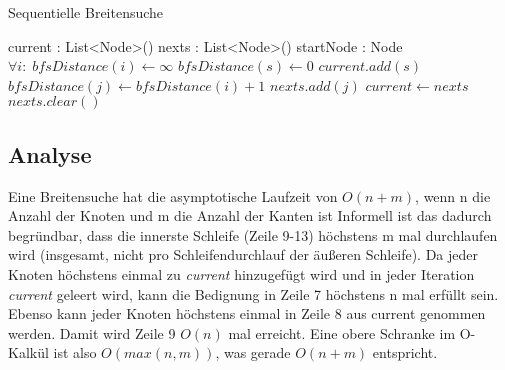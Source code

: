 \begin{algorithm}
	\caption{Sequentielle Breitensuche}
	\label{alg:sequential_bfs}
	\begin{algorithmic}[1]
		\State current : List<Node>()
		\State nexts : List<Node>()
		\State startNode : Node
		\State  $\forall i: \; bfsDistance(i) \gets \infty$
		\State $bfsDistance(s) \gets 0$
		\State $current.add(s)$
						\State $bfsDistance(j) \gets bfsDistance(i) + 1$
						\State $nexts.add(j)$
					\EndIf
				\EndFor
			\EndFor
			\State $current \gets nexts$
			\State $nexts.clear()$
		\EndWhile
	\end{algorithmic}
\end{algorithm}


\subsection{Analyse} %
\label{sub:analyse}
Eine Breitensuche hat die asymptotische Laufzeit von $O(n + m)$, wenn n die Anzahl der Knoten und m die Anzahl der Kanten ist Informell ist das dadurch begründbar, dass die innerste Schleife (Zeile 9-13) höchstens m mal durchlaufen wird (insgesamt, nicht pro Schleifendurchlauf der äußeren Schleife). Da jeder Knoten höchstens einmal zu \textit{current} hinzugefügt wird und in jeder Iteration \textit{current} geleert wird, kann die Bedignung in Zeile 7 höchstens n mal erfüllt sein. Ebenso kann jeder Knoten höchstens einmal in Zeile 8 aus current genommen werden. Damit wird Zeile 9 $O(n)$ mal erreicht. Eine obere Schranke im O-Kalkül ist also $O(max(n,m))$, was gerade $O(n + m)$ entspricht.

